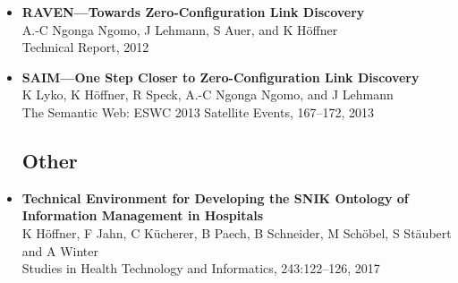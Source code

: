 \begin{itemize}
\item \textbf{RAVEN---Towards Zero-Configuration Link Discovery}~\citep{raven_report}\\
A.-C Ngonga Ngomo, J Lehmann, S Auer, and K Höffner\\
Technical Report, 2012

\item \textbf{SAIM---One Step Closer to Zero-Configuration Link Discovery}~\citep{Lyko2013}\\
K Lyko, K Höffner, R Speck, A.-C Ngonga Ngomo, and J Lehmann\\
The Semantic Web: ESWC 2013 Satellite Events, 167--172, 2013

\subsection*{Other}

\item \textbf{Technical Environment for Developing the {SNIK} Ontology of Information Management in Hospitals}~\citep{sniktec}\\
K Höffner, F Jahn, C Kücherer, B Paech, B Schneider, M Schöbel, S Stäubert and A Winter\\
Studies in Health Technology and Informatics, 243:122--126, 2017

\end{itemize}
